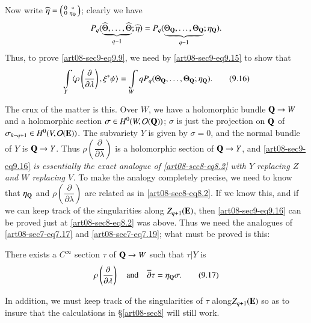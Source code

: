 Now write $\widehat{\eta}=\left(\begin{smallmatrix} 0 & *\\ 0 & \eta_{\mathbf{Q}}\end{smallmatrix}\right)$; clearly we have 
$$
P_{q}(\underbrace{\widehat{\Theta},\ldots,\widehat{\Theta}}_{q-1};\widehat{\eta})=P_{q}(\underbrace{\Theta_{\mathbf{Q}},\ldots,\Theta_{\mathbf{Q}}}_{q-1};\eta_{\mathbf{Q}}).
$$ 
Thus, to prove \eqref{art08-sec9-eq9.9}, we need by \eqref{art08-sec9-eq9.15} to show that
\begin{equation*}
\int\limits_{Y}\langle \rho\left(\dfrac{\partial}{\partial\lambda}\right), \xi^{*}\psi\rangle = \int\limits_{W}qP_{q}(\Theta_{\mathbf{Q}},\ldots,\Theta_{\mathbf{Q}};\eta_{\mathbf{Q}}).\tag{9.16}\label{art08-sec9-eq9.16}
\end{equation*}

The crux of the matter is this. Over $W$, we have a holomorphic bundle $\mathbf{Q}\to W$ and a holomorphic section $\sigma\in H^{0}(W,\mathcal{O}(\mathbf{Q}))$; $\sigma$ is just the projection on $\mathbf{Q}$ of $\sigma_{k-q+1}\in H^{0}(V,\mathcal{O}(\mathbf{E}))$. The subvariety $Y$ is given by $\sigma=0$, and the normal bundle of $Y$ is $\mathbf{Q}\to Y$. Thus $\rho\left(\dfrac{\partial}{\partial\lambda}\right)$ is a holomorphic section of $\mathbf{Q}\to Y$, and \eqref{art08-sec9-eq9.16} {\em is essentially the exact analogue of \eqref{art08-sec8-eq8.2} with $Y$ replacing $Z$ and $W$ replacing $V$.} To make the analogy completely precise, we need to know that $\eta_{\mathbf{Q}}$ and $\rho\left(\dfrac{\partial}{\partial\lambda}\right)$ are related as in \eqref{art08-sec8-eq8.2}. If we know this, and if we can keep track of the singularities along $Z_{q+1}(\mathbf{E})$, then \eqref{art08-sec9-eq9.16} can be proved just at \eqref{art08-sec8-eq8.2} was above. Thus we need the analogues of \eqref{art08-sec7-eq7.17} and \eqref{art08-sec7-eq7.19}; what must be proved is this:

There exists a $C^{\infty}$ section $\tau$ of $\mathbf{Q}\to W$ such that $\tau|Y$ is
\begin{equation*}
\rho\left(\frac{\partial}{\partial\lambda}\right)\quad\text{and}\quad \overline{\partial}\tau=\eta_{\mathbf{Q}}\sigma.\tag{9.17}\label{art08-sec9-eq9.17}
\end{equation*}

In addition, we must keep track of the singularities of $\tau$ along\break $Z_{q+1}(\mathbf{E})$ so as to insure that the calculations in \S\ref{art08-sec8} will still work.

\eject

